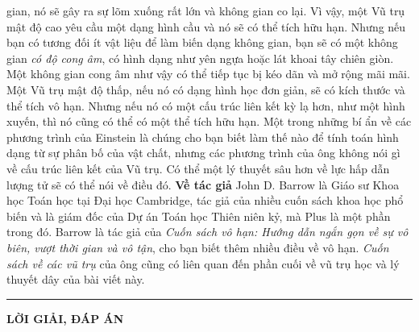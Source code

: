\begin{multicols}{2}
	gian, nó sẽ gây ra sự lõm xuống rất lớn và không gian co lại. Vì vậy, một
	Vũ trụ mật độ cao yêu cầu một dạng hình cầu và nó sẽ có thể tích hữu hạn.
	Nhưng nếu bạn có tương đối ít vật liệu để làm biến dạng không gian,
	bạn sẽ có một không gian \emph{có độ cong âm}, có hình dạng như yên ngựa hoặc lát khoai tây
	chiên giòn. Một không gian cong âm như vậy có thể tiếp tục bị kéo dãn và mở
	rộng mãi mãi. Một Vũ trụ mật độ thấp, nếu nó có dạng hình học đơn giản, sẽ có
	kích thước và thể tích vô hạn. Nhưng nếu nó có một cấu trúc liên kết kỳ lạ
	hơn, như một hình xuyến, thì nó cũng có thể có một thể tích hữu hạn. Một trong
	những bí ẩn về các phương trình của Einstein là chúng cho bạn biết làm thế nào
	để tính toán hình dạng từ sự phân bố của vật chất, nhưng các phương
	trình của ông không nói gì về cấu trúc liên kết của Vũ trụ. Có thể một
	lý thuyết sâu hơn về lực hấp dẫn lượng tử sẽ có thể nói về điều đó.
	\vskip 0.05cm
	\textbf{\color{quantoan}Về tác giả}
	\vskip 0.05cm
	John D. Barrow là Giáo sư Khoa học Toán học tại Đại học Cambridge, tác giả của
	nhiều cuốn sách khoa học phổ biến và là giám đốc của Dự án Toán học Thiên niên
	kỷ, mà Plus là một phần trong đó.
	\vskip 0.05cm
	Barrow là tác giả của \textit{Cuốn sách vô hạn: Hướng dẫn ngắn gọn về sự vô
	biên, vượt thời gian và vô tận}, cho bạn biết thêm nhiều điều về vô hạn.
	\textit{Cuốn sách về các vũ trụ} của ông cũng có liên quan đến phần cuối về vũ
	trụ học và lý thuyết dây của bài viết này.
\end{multicols}
\vspace*{-10pt}
\rule{1\linewidth}{0.1pt}
\begin{center}
	\textbf{\Large\color{quantoan}LỜI GIẢI, ĐÁP ÁN}
\end{center}
